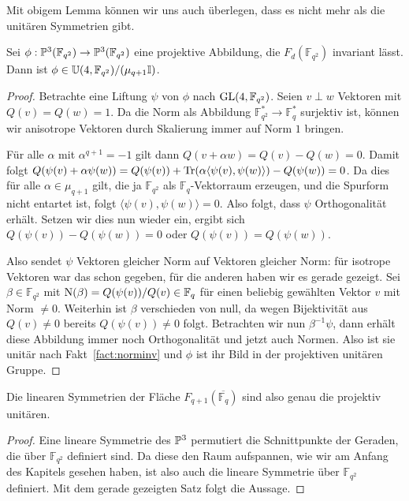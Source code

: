 Mit obigem Lemma können wir uns auch überlegen, dass es nicht mehr als die unitären Symmetrien gibt.
\begin{theorem}
Sei $\phi: \mathbb P^{3}(\mathbb F_{q^2}) \rightarrow \mathbb P^{3}(\mathbb F_{q^2})$ eine projektive Abbildung, die $F_d(\mathbb F_{q^2})$ invariant lässt. Dann ist $\phi \in \mathbb U(4,\mathbb F_{q^2})/(\mu_{q+1} \mathbb I)$.
\end{theorem}
\begin{proof}
Betrachte eine Liftung $\psi$ von $\phi$ nach $\mathrm{GL}(4,\mathbb F_{q^2})$. Seien $v \perp w$ Vektoren mit $Q(v) = Q(w) = 1$. Da die Norm als Abbildung $\mathbb F_{\!q^2}^* \to \mathbb F_q^*$ surjektiv ist, können wir anisotrope Vektoren durch Skalierung immer auf Norm $1$ bringen.

Für alle $\alpha$ mit $\alpha^{q+1} = -1$ gilt dann $Q(v + \alpha w) = Q(v) - Q(w) = 0$. Damit folgt $Q(\psi(v) + \alpha \psi(w)) = Q(\psi(v)) + \operatorname{Tr}(\alpha \langle \psi(v), \psi(w) \rangle) - Q(\psi(w)) = 0$. Da dies für alle $\alpha \in \mu_{q+1}$ gilt, die ja $\mathbb F_{q^2}$ als $\mathbb F_q$-Vektorraum erzeugen, und die Spurform nicht entartet ist, folgt $\langle \psi(v), \psi(w) \rangle = 0$. Also folgt, dass $\psi$ Orthogonalität erhält. Setzen wir dies nun wieder ein, ergibt sich $Q(\psi(v)) - Q(\psi(w)) = 0$ oder $Q(\psi(v)) = Q(\psi(w))$.

Also sendet $\psi$ Vektoren gleicher Norm auf Vektoren gleicher Norm: für isotrope Vektoren war das schon gegeben, für die anderen haben wir es gerade gezeigt. Sei $\beta \in \mathbb F_{q^2}$ mit $\operatorname{N}(\beta) = Q(\psi(v)) / Q(v) \in \mathbb F_q$ für einen beliebig gewählten Vektor $v$ mit Norm $\neq 0$. Weiterhin ist $\beta$ verschieden von null, da wegen Bijektivität aus $Q(v) \neq 0$ bereits $Q(\psi(v)) \neq 0$ folgt. Betrachten wir nun $\beta^{-1} \psi$, dann erhält diese Abbildung immer noch Orthogonalität und jetzt auch Normen. Also ist sie unitär nach Fakt~\ref{fact:norminv} und $\phi$ ist ihr Bild in der projektiven unitären Gruppe.
\end{proof}
\begin{coroll}
Die linearen Symmetrien der Fläche $F_{q+1}(\overline{\mathbb F_q})$ sind also genau die projektiv unitären.
\end{coroll}
\begin{proof}
Eine lineare Symmetrie des $\mathbb P^{3}$ permutiert die Schnittpunkte der Geraden, die über $\mathbb F_{q^2}$ definiert sind. Da diese den Raum aufspannen, wie wir am Anfang des Kapitels gesehen haben, ist also auch die lineare Symmetrie über $\mathbb F_{q^2}$ definiert. Mit dem gerade gezeigten Satz folgt die Aussage.
\end{proof}

